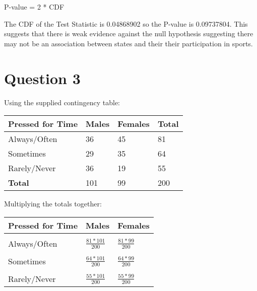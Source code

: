 \documentclass[oneside, a4paper]{article}
\begin{document}
P-value = 2 * CDF 

The CDF of the Test Statistic is 0.04868902 so the P-value is 0.09737804. This suggests that there is weak evidence against the null hypothesis suggesting there may not be an association between states and their their participation in sports.


\newpage
\section{Question 3}

\begin{center}
    Using the supplied contingency table:

    \begin{table}[H]
        \centering
        \begin{tabular}{|l|l|l|l|}
        \hline
        \textbf{Pressed for Time} & \textbf{Males} & \textbf{Females} & \textbf{Total} \\ \hline
        Always/Often              & 36             & 45               & 81             \\ \hline
        Sometimes                 & 29             & 35               & 64             \\ \hline
        Rarely/Never              & 36             & 19               & 55             \\ \hline
        \textbf{Total}            & 101            & 99               & 200            \\ \hline
        \end{tabular}
    \end{table}

    Multiplying the totals together:
    \begin{table}[H]
        \centering
        \begin{tabular}{|l|l|l|}
        \hline
        \textbf{Pressed for Time} & \textbf{Males} & \textbf{Females} \\ \hline
        \\[-1em]
        Always/Often              & $\frac{81*101}{200}$              & $\frac{81*99}{200}$               \\ \hline
        \\[-1em]
        Sometimes                 & $\frac{64*101}{200}$             & $\frac{64*99}{200}$               \\ \hline
        \\[-1em]
        Rarely/Never              & $\frac{55*101}{200}$             & $\frac{55*99}{200}$               \\ \hline
        \end{tabular}
    \end{table}
    

\end{center}
\end{document}
